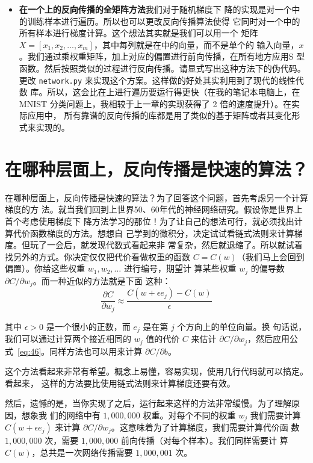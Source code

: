 \begin{itemize}
\item \textbf{在一个\minibatch{}上的反向传播的全矩阵方法}\quad 我们对于随机梯度下
  降的实现是对一个\minibatch{}中的训练样本进行遍历。所以也可以更改反向传播算法使得
  它同时对一个\minibatch{}中的所有样本进行梯度计算。这个想法其实就是我们可以用一个
  矩阵 $X=[x_1, x_2, ..., x_m]$，其中每列就是在\minibatch{}中的向量，而不是单个的
  输入向量，$x$。我们通过乘权重矩阵，加上对应的偏置进行前向传播，在所有地方应用S
  型函数。然后按照类似的过程进行反向传播。请显式写出这种方法下的伪代码。更改
  \lstinline!network.py! 来实现这个方案。这样做的好处其实利用到了现代的线性代数
  库。所以，这会比在\minibatch{}上进行遍历要运行得更快（在我的笔记本电脑上，在
    MNIST 分类问题上，我相较于上一章的实现获得了 2 倍的速度提升）。在实际应用中，
  所有靠谱的反向传播的库都是用了类似的基于矩阵或者其变化形式来实现的。
\end{itemize}

\section{在哪种层面上，反向传播是快速的算法？}

在哪种层面上，反向传播是快速的算法？为了回答这个问题，首先考虑另一个计算梯度的方
法。就当我们回到上世界50、60年代的神经网络研究。假设你是世界上首个考虑使用梯度下
降方法学习的那位！为了让自己的想法可行，就必须找出计算代价函数梯度的方法。想想自
己学到的微积分，决定试试看链式法则来计算梯度。但玩了一会后，就发现代数式看起来非
常复杂，然后就退缩了。所以就试着找另外的方式。你决定仅仅把代价看做权重的函数 $C
= C(w)$（我们马上会回到偏置）。你给这些权重 $w_1, w_2, \ldots$ 进行编号，期望计
算某些权重 $w_j$ 的偏导数 $\partial C / \partial w_j$。而一种近似的方法就是下面
这种：
\begin{equation}
  \frac{\partial
    C}{\partial w_{j}} \approx \frac{C(w+\epsilon
    e_j)-C(w)}{\epsilon}
  \label{eq:46}\tag{46}
\end{equation}

其中 $\epsilon > 0$ 是一个很小的正数，而 $e_j$ 是在第 $j$ 个方向上的单位向量。换
句话说，我们可以通过计算两个接近相同的 $w_j$ 值的代价 $C$ 来估计 $\partial
C/\partial w_j$，然后应用公式~\eqref{eq:46}。同样方法也可以用来计算 $\partial
C/\partial b$。

这个方法看起来非常有希望。概念上易懂，容易实现，使用几行代码就可以搞定。看起来，
这样的方法要比使用链式法则来计算梯度还要有效。

然后，遗憾的是，当你实现了之后，运行起来这样的方法非常缓慢。为了理解原因，想象我
们的网络中有 $1,000,000$ 权重。对每个不同的权重 $w_j$ 我们需要计算 $C(w+\epsilon
e_j)$ 来计算 $\partial C/\partial w_j$。这意味着为了计算梯度，我们需要计算代价函
数 $1, 000, 000 $ 次，需要 $1, 000, 000$ 前向传播（对每个样本）。我们同样需要计
算 $C(w)$，总共是一次网络传播需要 $1,000,001$ 次。

